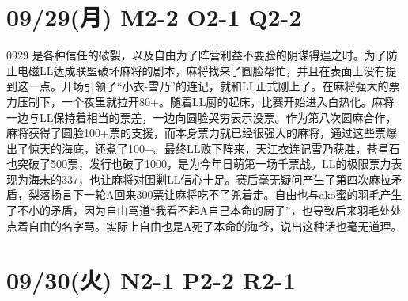 \section{09/29(月) M2-2 O2-1 Q2-2}


0929 是各种信任的破裂，以及自由为了阵营利益不要脸的阴谋得逞之时。为了防止电磁LL达成联盟破坏麻将的剧本，麻将找来了圆脸帮忙，并且在表面上没有提到这一点。开场引领了“小衣-雪乃”的连记，就和LL正式刚上了。在麻将强大的票力压制下，一个夜里就拉开80+。随着LL厨的起床，比赛开始进入白热化。麻将一边与LL保持着相当的票差，一边向圆脸哭穷表示没票。作为第八次圆麻合作，麻将获得了圆脸100+票的支援，而本身票力就已经很强大的麻将，通过这些票爆出了惊天的海底，还煮了100+。最终LL败下阵来，天江衣连记雪乃获胜，苍星石也突破了500票，发行也破了1000，是为今年日萌第一场千票战。LL的极限票力表现为海未的337，也让麻将对围剿LL信心十足。赛后毫无疑问产生了第四次麻拉矛盾，梨落扬言下一轮A回来300票让麻将吃不了兜着走。自由也与ako蜜的羽毛产生了不小的矛盾，因为自由骂道“我看不起A自己本命的厨子”，也导致后来羽毛处处点着自由的名字骂。实际上自由也是A死了本命的海爷，说出这种话也毫无道理。

\section{09/30(火) N2-1 P2-2 R2-1}

